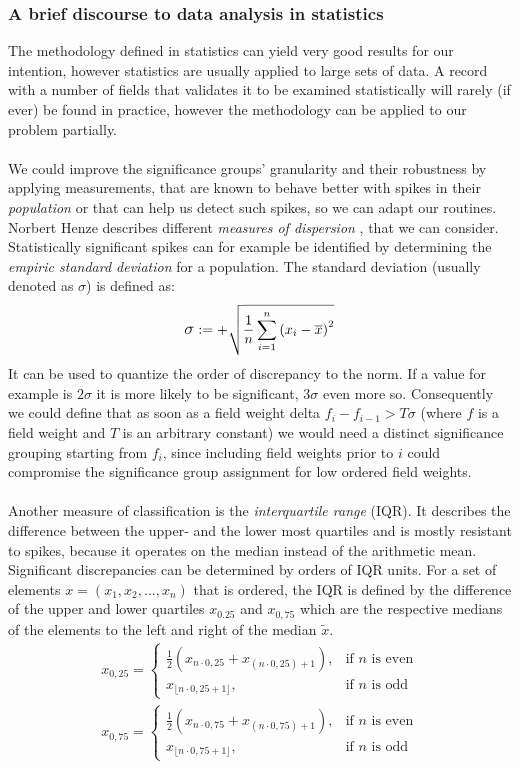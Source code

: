 \subsubsection{A brief discourse to data analysis in statistics}
The methodology defined in statistics can yield very good results for our intention, however statistics are usually applied to large sets of data. A record with a number of fields that validates it to be examined statistically will rarely (if ever) be found in practice, however the methodology can be applied to our problem partially.\\\\
We could improve the significance groups' granularity and their robustness by applying measurements, that are known to behave better with spikes in their \textit{population} or that can help us detect such spikes, so we can adapt our routines. Norbert Henze describes different \textit{measures of dispersion} , that we can consider. Statistically significant spikes can for example be identified by determining the \textit{empiric standard deviation} for a population. The standard deviation (usually denoted as $\sigma$) is defined as:
\begin{align}
\scalemath{1.2}{\sigma} := +\sqrt{\frac{1}{n} \sum \limits_{i=1}^n\left(x_i-\overline x\right)^2}
\end{align}
It can be used to quantize the order of discrepancy to the norm. If a value for example is $2\sigma$ it is more likely to be significant, $3\sigma$ even more so. Consequently we could define that as soon as a field weight delta $f_i-f_{i-1}>T\sigma$ (where $f$ is a field weight and $T$ is an arbitrary constant) we would need a distinct significance grouping starting from $f_i$, since including  field weights prior to $i$ could compromise the significance group assignment for low ordered field weights.\\\\
Another measure of classification is the \textit{interquartile range} (IQR). It describes the difference between the upper- and the lower most quartiles and is mostly resistant to spikes, because it operates on the median instead of the arithmetic mean. Significant discrepancies can be determined by orders of IQR units. For a set of elements $x = (x_1, x_2, ..., x_n)$ that is ordered, the IQR is defined by the difference of the upper and lower quartiles $x_{0.25}$ and $x_{0,75}$ which are the respective medians of the elements to the left and right of the median $\tilde{x}$.
\begin{align}
x_{0{,}25} = \begin{cases}
\tfrac{1}{2}(x_{n \cdot 0{,}25} + x_{(n \cdot 0{,}25) + 1}),  & \text{if }n \text{ is even}\\
x_{\lfloor n \cdot 0{,}25 +1\rfloor}, & \text{if }n \text{ is odd}
\end{cases}\\
x_{0{,}75} = \begin{cases}
\tfrac{1}{2}(x_{n \cdot 0{,}75} + x_{(n \cdot 0{,}75) + 1}),  & \text{if }n \text{ is even}\\
x_{\lfloor n \cdot 0{,}75 +1\rfloor}, & \text{if }n \text{ is odd}
\end{cases}
\end{align}
